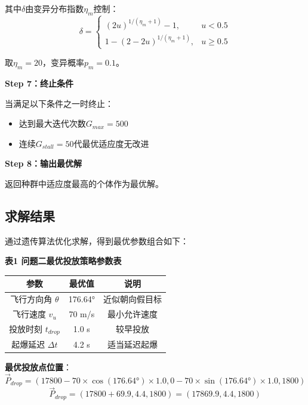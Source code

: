 \documentclass[12pt,a4paper]{article}
\begin{document}
\indent 其中$\delta$由变异分布指数$\eta_m$控制：
\begin{equation}
\delta = 
\begin{cases}
(2u)^{1/(\eta_m+1)} - 1, & u < 0.5 \\
1 - (2-2u)^{1/(\eta_m+1)}, & u \geq 0.5
\end{cases}
\end{equation}

\indent 取$\eta_m = 20$，变异概率$p_m = 0.1$。

\indent \textbf{Step 7：终止条件}

\indent 当满足以下条件之一时终止：
\begin{itemize}
\item 达到最大迭代次数$G_{max} = 500$
\item 连续$G_{stall} = 50$代最优适应度无改进
\end{itemize}

\indent \textbf{Step 8：输出最优解}

\indent 返回种群中适应度最高的个体作为最优解。

\subsection{求解结果}

\indent 通过遗传算法优化求解，得到最优参数组合如下：

\noindent\textbf{表1 问题二最优投放策略参数表}

\begin{table}[H]
\centering
\begin{tabular}{ccc}
\toprule
\textbf{参数} & \textbf{最优值} & \textbf{说明} \\
\midrule
飞行方向角 $\theta$ & 176.64° & 近似朝向假目标 \\
飞行速度 $v_u$ & 70 m/s & 最小允许速度 \\
投放时刻 $t_{drop}$ & 1.0 s & 较早投放 \\
起爆延迟 $\Delta t$ & 4.2 s & 适当延迟起爆 \\
\bottomrule
\end{tabular}
\end{table}

\noindent\textbf{最优投放点位置}：
\begin{equation}
\vec{P}_{drop} = (17800 - 70 \times \cos(176.64°) \times 1.0, 0 - 70 \times \sin(176.64°) \times 1.0, 1800)
\end{equation}
\begin{equation}
\vec{P}_{drop} = (17800 + 69.9, 4.4, 1800) = (17869.9, 4.4, 1800)
\end{equation}
\end{document}
